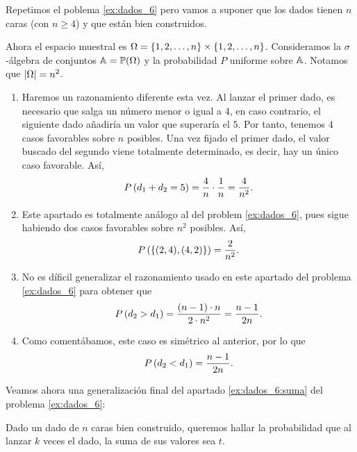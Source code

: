 \begin{exercise} \label{ex:dados_n}
  Repetimos el poblema \ref{ex:dados_6} pero vamos a suponer que los dados tienen $n$ caras (con $n \ge 4$) y que están bien construidos.
\end{exercise}

\begin{solution}
  Ahora el espacio muestral es $\Omega = \left\lbrace1, 2, \dots, n\right\rbrace \times \left\lbrace1, 2, \dots, n\right\rbrace$. Consideramos la $\sigma$-álgebra de conjuntos $\mathbb{A} = \mathbb{P}(\Omega)$ y la probabilidad $P$ uniforme sobre $\mathbb{A}$. Notamos que $\left|\Omega\right| = n^2$.

  \begin{enumerate}
    \item Haremos un razonamiento diferente esta vez. Al lanzar el primer dado, es necesario que salga un número menor o igual a $4$, en caso contrario, el siguiente dado añadiría un valor que superaría el $5$. Por tanto, tenemos $4$ casos favorables sobre $n$ posibles. Una vez fijado el primer dado, el valor buscado del segundo viene totalmente determinado, es decir, hay un único caso favorable. Así,
    \[
      P\left(d_1 + d_2 = 5\right) = \frac{4}{n} \cdot \frac{1}{n} = \frac{4}{n^2}.
    \]
    \item Este apartado es totalmente análogo al del problem \ref{ex:dados_6}, pues sigue habiendo dos casos favorables sobre $n^2$ posibles. Así,
    \[
      P\left(\left\lbrace(2, 4), (4, 2)\right\rbrace\right) = \frac{2}{n^2}.
    \]
    \item No es díficil generalizar el razonamiento usado en este apartado del problema \ref{ex:dados_6} para obtener que
    \[
      P\left(d_2 > d_1\right) = \frac{(n - 1) \cdot n}{2 \cdot n^2} = \frac{n - 1}{2n}.
    \]
    \item Como comentábamos, este caso es simétrico al anterior, por lo que
    \[
      P\left(d_2 < d_1\right) = \frac{n - 1}{2n}.
    \]
  \end{enumerate}
\end{solution}

Veamos ahora una generalización final del apartado \ref{ex:dados_6:suma} del problema \ref{ex:dados_6}:

\begin{exercise*}
  Dado un dado de $n$ caras bien construido, queremos hallar la probabilidad que al lanzar $k$ veces el dado, la suma de sus valores sea $t$.
\end{exercise*}

